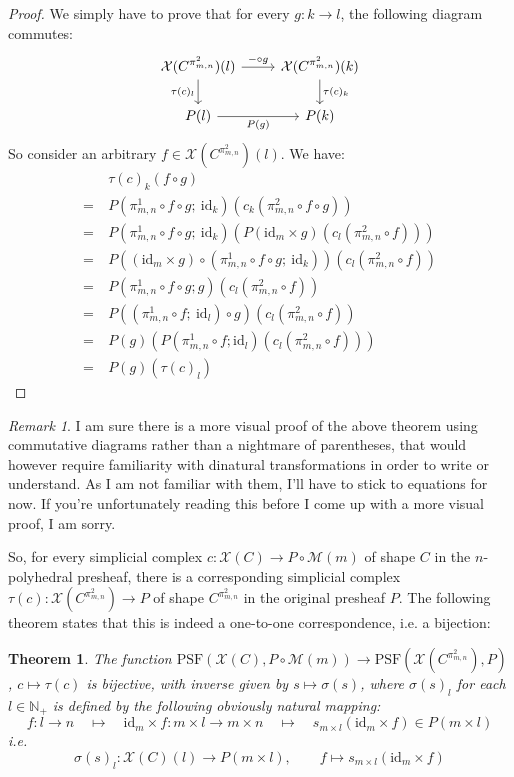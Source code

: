 \documentclass{article}
\newtheorem{theorem}{Theorem}[subsection]
\theoremstyle{remark}
\newtheorem{remark}{Remark}[subsection]
\theoremstyle{definition}
\newcommand{\N}{\mathbb N}
\newcommand{\PSF}{\mathrm{PSF}}
\newcommand{\id}{\mathrm{id}}
\newcommand{\X}{\mathcal X}
\newcommand{\M}{\mathcal M}
\begin{document}
	\begin{proof}
		We simply have to prove that for every $g:k\to l$, the following diagram commutes:
		\[\begin{tikzcd}
			\X(C^{\pi^2_{m,n}})(l)\arrow{r}{-\circ g}\arrow{d}[swap]{\tau(c)_l}&\X(C^{\pi^2_{m,n}})(k)\arrow{d}{\tau(c)_k}\\
			P(l)\arrow{r}[swap]{P(g)}&P(k)
		\end{tikzcd}\]
		So consider an arbitrary $f\in\X(C^{\pi^2_{m,n}})(l)$. We have:
		\begin{align*}
			&\tau(c)_k(f\circ g)\\
			=\ &P(\pi^1_{m,n}\circ f\circ g;\ \id_k)(c_k(\pi^2_{m,n}\circ f\circ g))\\
			=\ &P(\pi^1_{m,n}\circ f\circ g;\ \id_k)(P(\id_m\times g)(c_l(\pi^2_{m,n}\circ f)))\\
			=\ &P((\id_m\times g)\circ(\pi^1_{m,n}\circ f\circ g;\ \id_k))(c_l(\pi^2_{m,n}\circ f))\\
			=\ &P(\pi^1_{m,n}\circ f\circ g;g)(c_l(\pi^2_{m,n}\circ f))\\
			=\ &P((\pi^1_{m,n}\circ f;\ \id_l)\circ g)(c_l(\pi^2_{m,n}\circ f))\\
			=\ &P(g)(P(\pi^1_{m,n}\circ f;\id_l)(c_l(\pi^2_{m,n}\circ f)))\\
			=\ &P(g)(\tau(c)_l)
		\end{align*}
	\end{proof}
	\begin{remark}
		I am sure there is a more visual proof of the above theorem using commutative diagrams rather than a nightmare of parentheses, that would however require familiarity with dinatural transformations in order to write or understand. As I am not familiar with them, I'll have to stick to equations for now. If you're unfortunately reading this before I come up with a more visual proof, I am sorry.
	\end{remark}
	So, for every simplicial complex $c:\X(C)\to P\circ\M(m)$ of shape $C$ in the $n$-polyhedral presheaf, there is a corresponding simplicial complex $\tau(c):\X(C^{\pi^2_{m,n}})\to P$ of shape $C^{\pi^2_{m,n}}$ in the original presheaf $P$. The following theorem states that this is indeed a one-to-one correspondence, i.e. a bijection:
	\begin{theorem}\label{taubij}
		The function $\PSF(\X(C),P\circ\M(m))\to\PSF(\X(C^{\pi^2_{m,n}}),P)$, $c\mapsto\tau(c)$ is bijective, with inverse given by $s\mapsto\sigma(s)$, where $\sigma(s)_l$ for each $l\in\N_+$ is defined by the following obviously natural mapping:
		\[f:l\to n\quad\longmapsto\quad\id_m\times f:m\times l\to m\times n\quad\longmapsto\quad s_{m\times l}(\id_m\times f)\in P(m\times l)\]
		i.e.
		\begin{equation}\label{sigma}
			\sigma(s)_l:\X(C)(l)\to P(m\times l),\qquad f\mapsto s_{m\times l}(\id_m\times f)
		\end{equation}
	\end{theorem}
\end{document}
